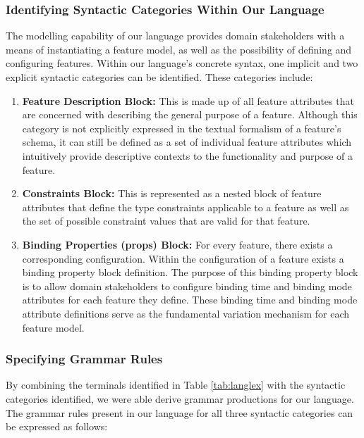 \documentclass[conference]{IEEEtran}
\begin{document}
\subsubsection{Identifying Syntactic Categories Within Our Language}
The modelling capability of our language provides domain stakeholders with a means of instantiating a feature model, as well as the possibility of defining and configuring features. Within our language's concrete syntax, one implicit and two explicit syntactic categories can be identified. These categories include:
\begin{enumerate}
    \item \textbf{Feature Description Block:} This is made up of all feature attributes that are concerned with describing the general purpose of a feature. Although this category is not explicitly expressed in the textual formalism of a feature's schema, it can still be defined as a set of individual feature attributes which intuitively provide descriptive contexts to the functionality and purpose of a feature.
    \item \textbf{Constraints Block:} This is represented as a nested block of feature attributes that define the type constraints applicable to a feature as well as the set of possible constraint values that are valid for that feature.
    \item \textbf{Binding Properties (props) Block:} For every feature, there exists a corresponding configuration. Within the configuration of a feature exists a binding property block definition. The purpose of this binding property block is to allow domain stakeholders to configure binding time and binding mode attributes for each feature they define. These binding time and binding mode attribute definitions serve as the fundamental variation mechanism for each feature model.
\end{enumerate}
 
\subsubsection{Specifying Grammar Rules} By combining the terminals identified in Table \ref{tab:langlex} with the syntactic categories identified, we were able derive grammar productions for our language. The grammar rules present in our language for all three syntactic categories can be expressed as follows:\\
\end{document}
